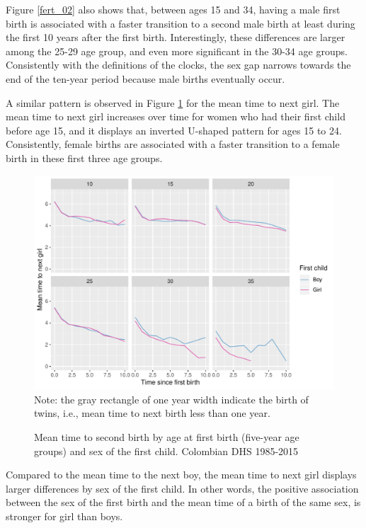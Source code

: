 \documentclass{article}
\begin{document}
Figure \ref{fert_02} also shows that, between ages 15 and 34, having a male first birth is associated with a faster transition to a second male birth at least during the first 10 years after the first birth. Interestingly, these differences are larger among the 25-29 age group, and even more significant in the 30-34 age groups. Consistently with the definitions of the clocks, the sex gap narrows towards the end of the ten-year period because male births eventually occur. 

A similar pattern is observed in Figure \ref{fert_03} for the mean time to next girl. The mean time to next girl increases over time for women who had their first child before age 15, and it displays an inverted U-shaped pattern for ages 15 to 24. Consistently, female births are associated with a faster transition to a female birth in these first three age groups.

\begin{figure}[H]
    \centering
    \caption{Mean time to second birth by age at first birth (five-year age groups) and sex of the first child. Colombian DHS 1985-2015}
    \includegraphics[scale=0.8]{Spells/Figures/mt_second_gir_by_sex_first_cohort.pdf}\\
    \label{fert_03}
    Note: the gray rectangle of one year width indicate the birth of twins, i.e., mean time to next birth less than one year.
\end{figure}

Compared to the mean time to the next boy, the mean time to next girl displays larger differences by sex of the first child. In other words, the positive association between the sex of the first birth and the mean time of a birth of the same sex, is stronger for girl than boys.
\end{document}
